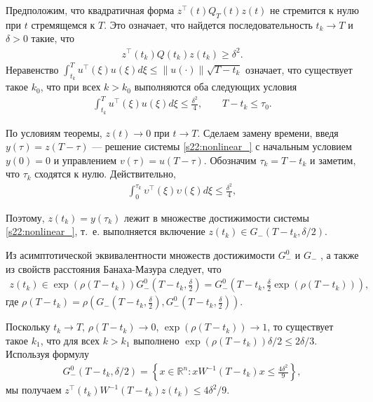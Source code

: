 \documentclass[../main.tex]{subfiles}
\begin{document}
Предположим, что квадратичная форма $z^{\top}(t)Q_T(t)z(t) $ не стремится к нулю при $t$ стремящемся к $T$.
Это означает, что найдется последовательность $ t_k \to T$ и $\delta > 0$ такие, что 
 \begin{gather}\label{s22:zqz_geq_del2}
 z^{\top}(t_k)Q(t_k)z(t_k) \geqslant \delta^2. 
 \end{gather}
Неравенство $ \int_{t_k}^{T} u^{\top}(\xi)u(\xi) d\xi \leqslant 
\|u(\cdot)\|\sqrt{T - t_k} $ означает, что существует такое $k_0$, что при всех $k > k_0$ выполняются оба следующих условия 
\begin{gather*}
 \int_{t_k}^{T} u^{\top}(\xi)u(\xi) d\xi \leqslant \frac{\delta^2}{4}, \qquad T-t_k \leqslant \tau_0.
\end{gather*}

По условиям теоремы, $z(t) \to 0 $ при $t \to T$. 
Сделаем замену времени, введя $y(\tau)=z(T-\tau)$ --- решение системы \eqref{s22:nonlinear_} с начальным условием $y(0)=0$ и управлением $ v(\tau)=u(T-\tau)$. 
Обозначим $\tau_k = T - t_k$ и заметим, что $\tau_k $ сходятся к нулю. 
Действительно, 
\begin{gather*}
 \int_{0}^{\tau_k} \upsilon^{\top}(\xi)\upsilon(\xi) 
 d\xi \leqslant \frac{\delta^2}{4},
\end{gather*}

 
Поэтому, $z(t_k) = y(\tau_k) $ лежит в множестве достижимости системы \eqref{s22:nonlinear_}, т.~е. выполняется включение $z(t_k) \in G_{-}(T-t_k,\delta/2)$.
 
 
Из асимптотической эквивалентности множеств достижимости $G_{-}^0$ и $ G_{-}$ \cite{GusevOsipovTrudy}, а также из свойств расстояния Банаха-Мазура следует, что 
\begin{gather*}
 z(t_k) \in \exp(\rho(T-t_k))G_{-}^0(T-t_k,\frac{\delta}{2})=G_{-}^0(T-t_k,\frac{\delta}{2}\exp(\rho(T-t_k))),
\end{gather*}
 где $\rho(T-t_k)=\rho(G_{-}(T-t_k,\frac{\delta}{2}),G_{-}^0(T-t_k,\frac{\delta}{2}))$.

 Поскольку $t_k \to T$, $\rho(T-t_k) \to 0$, $\exp(\rho(T-t_k)) \to 1$, то существует такое $k_1$, что для всех $k > k_1$ выполнено $\exp(\rho(T-t_k))\delta/2 \leqslant 2\delta/3$. 
Используя формулу
\begin{gather*}
G_{-}^0(T-t_k, \delta/2)=\left\{x \in \mathbb{R}^n: x W^{-1}(T-t_k) x \leqslant \frac{4\delta^2}{9} \right\}, 
\end{gather*}
мы получаем $ z^{\top}(t_k) W^{-1}(T-t_k) z(t_k) \leqslant 4\delta^2/9$.
\end{document}
